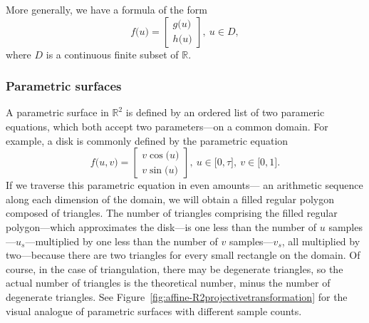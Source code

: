 More generally, we have a formula of the form 
\begin{equation}
    f\lparen u\rparen=
    \begin{bmatrix}
        g\lparen u\rparen \\
        h\lparen u\rparen
    \end{bmatrix},\ u\in{}D,
\end{equation}
where \(D\) is a continuous finite subset of \(\mathbb{R}\).

\subsubsection{Parametric surfaces}

A parametric surface in \(\mathbb{R}^{2}\) is defined by an ordered 
list of two parameric equations, which both accept two parameters---on 
a common domain. For example, a disk is commonly defined by the 
parametric equation 
\[
    f\lparen u,v\rparen=
    \begin{bmatrix}
        v\cos\lparen u\rparen \\
        v\sin\lparen u\rparen
    \end{bmatrix},\ u\in\lbrack0,\tau\rbrack,\ v\in\lbrack0,1\rbrack.
\]
If we traverse this parametric equation in even amounts---%
an arithmetic sequence along each dimension of the domain, we will 
obtain a filled regular polygon composed of triangles. 
The number of triangles 
comprising the filled regular polygon---which approximates the disk---is 
one less than the number of \(u\) samples---\(u_s\)---multiplied by 
one less than the number of \(v\) samples---\(v_s\), all multiplied by 
two---because there are two triangles for every small rectangle on the 
domain. Of course, in the case of triangulation, there may be 
degenerate triangles, so the actual number of triangles is the 
theoretical number, minus the number of degenerate triangles.
See Figure~\ref{fig:affine-R2projectivetransformation} for the visual analogue of
parametric surfaces with different sample counts.


